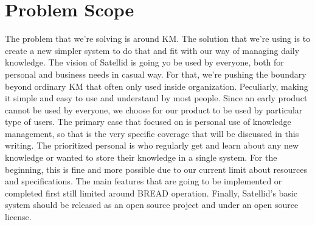 \section{Problem Scope}
\label{sec:problem-scope}

The problem that we're solving is around \ac{KM}.
The solution that we're using is to create a new simpler system to do that and fit with our way of managing daily knowledge.
The vision of Satellid is going yo be used by everyone, both for personal and business needs in casual way.
For that, we're pushing the boundary beyond ordinary \ac{KM} that often only used inside organization.
Peculiarly, making it simple and easy to use and understand by most people.
Since an early product cannot be used by everyone, we choose for our product to be used by particular type of users.
The primary case that focused on is personal use of knowledge management, so that is the very specific coverage that will be discussed in this writing.
The prioritized personal is who regularly get and learn about any new knowledge or wanted to store their knowledge in a single system.
For the beginning, this is fine and more possible due to our current limit about resources and specifications.
The main features that are going to be implemented or completed first still limited around \ac{BREAD} operation.
Finally, Satellid's basic system should be released as an open source project and under an open source license.
